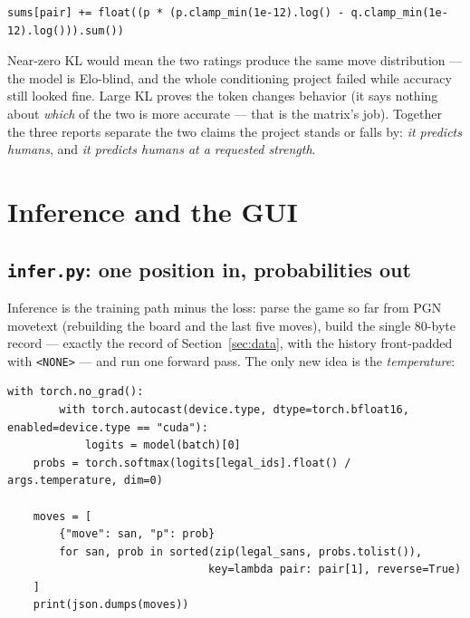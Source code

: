 \documentclass[10pt,a4paper]{article}
\newcommand{\code}[1]{\texttt{#1}}
\begin{document}
\begin{lstlisting}[style=code, caption={KL accumulation over legal moves
(\code{evaluate.py}, excerpt); \code{p} and \code{q} are the
legal-restricted softmaxes of the same position under two Elo tokens.},
label={lst:kl}]
sums[pair] += float((p * (p.clamp_min(1e-12).log() - q.clamp_min(1e-12).log())).sum())
\end{lstlisting}

Near-zero KL would mean the two ratings produce the same move
distribution --- the model is Elo-blind, and the whole conditioning
project failed while accuracy still looked fine. Large KL proves the
token changes behavior (it says nothing about \emph{which} of the two is
more accurate --- that is the matrix's job). Together the three reports
separate the two claims the project stands or falls by: \emph{it
predicts humans}, and \emph{it predicts humans \emph{at} a requested
strength}.

\section{Inference and the GUI}\label{sec:infer}

\subsection{\texttt{infer.py}: one position in, probabilities out}

Inference is the training path minus the loss: parse the game so far
from PGN movetext (rebuilding the board and the last five moves), build
the single 80-byte record --- exactly the record of
Section~\ref{sec:data}, with the history front-padded with
\code{<NONE>} --- and run one forward pass. The only new idea is the
\emph{temperature}:

\begin{lstlisting}[style=code, caption={From logits to a sorted JSON
distribution (\code{infer.py}, excerpt). The temperature divides the
logits \emph{before} the legal-restricted softmax.}, label={lst:infer}]
    with torch.no_grad():
        with torch.autocast(device.type, dtype=torch.bfloat16, enabled=device.type == "cuda"):
            logits = model(batch)[0]
    probs = torch.softmax(logits[legal_ids].float() / args.temperature, dim=0)

    moves = [
        {"move": san, "p": prob}
        for san, prob in sorted(zip(legal_sans, probs.tolist()),
                               key=lambda pair: pair[1], reverse=True)
    ]
    print(json.dumps(moves))
\end{lstlisting}
\end{document}
